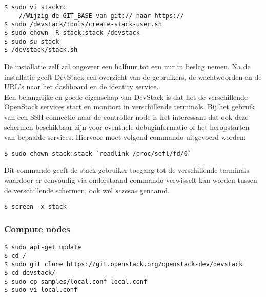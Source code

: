\begin{appendices}
\begin{code}
\begin{verbatim}
$ sudo vi stackrc
	//Wijzig de GIT_BASE van git:// naar https://
$ sudo /devstack/tools/create-stack-user.sh
$ sudo chown -R stack:stack /devstack
$ sudo su stack
$ /devstack/stack.sh
\end{verbatim}
\end{code}

De installatie zelf zal ongeveer een halfuur tot een uur in beslag nemen. Na de installatie geeft DevStack een overzicht van de gebruikers, de wachtwoorden en de URL's naar het dashboard en de identity service.
\\
Een belangrijke en goede eigenschap van DevStack is dat het de verschillende OpenStack services start en monitort in verschillende terminals. Bij het gebruik van een SSH-connectie naar de controller node is het interessant dat ook deze schermen beschikbaar zijn voor eventuele debuginformatie of het heropstarten van bepaalde services. Hiervoor moet volgend commando uitgevoerd worden:

\begin{code}
\begin{verbatim}
$ sudo chown stack:stack `readlink /proc/sefl/fd/0`
\end{verbatim}
\end{code}

Dit commando geeft de stack-gebruiker toegang tot de verschillende terminals waardoor er eenvoudig via onderstaand commando verwisselt kan worden tussen de verschillende schermen, ook wel \textit{screens} genaamd.

\begin{code}
\begin{verbatim}
$ screen -x stack
\end{verbatim}
\end{code}

\subsubsection{Compute nodes}

\begin{code}
\begin{verbatim}
$ sudo apt-get update
$ cd /
$ sudo git clone https://git.openstack.org/openstack-dev/devstack
$ cd devstack/
$ sudo cp samples/local.conf local.conf
$ sudo vi local.conf
\end{verbatim}
\end{code}


\end{appendices}
